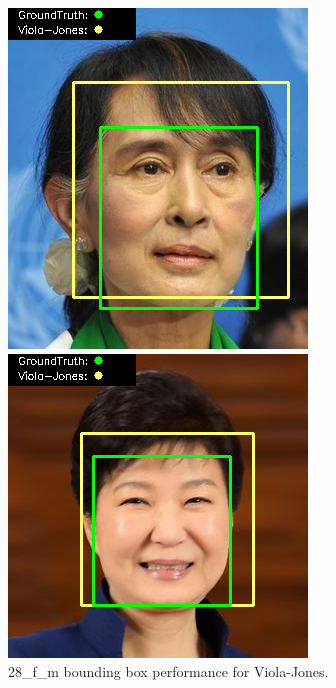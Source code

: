 \documentclass{l4proj}
\begin{document}
\begin{appendices}
\begin{figure}[h!]
  \centering
  \begin{minipage}{0.49\textwidth}
    \centering
     \includegraphics[width=\textwidth]{images/appendix/viola/28.png}
    \caption{28\_f\_m bounding box performance for Viola-Jones.}
    \label{whoopi_result}
  \end{minipage}
    \hfill
    \begin{minipage}{0.49\textwidth}
    \centering
     \includegraphics[width=\textwidth]{images/appendix/viola/29.png}

\end{minipage}
\end{figure}
\end{appendices}
\end{document}
